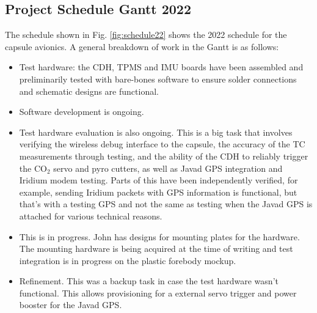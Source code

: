 \documentclass{article}
\begin{document}
\begin{landscape}
\begin{table}[!bp]
\begin{table}[H]
\begin{tabular}{p{3cm} | p{13cm}  L p{5cm}}
					
					
					
					
				\end{tabular}
			\end{table}
\end{table}
\end{landscape}
\restoregeometry


\begin{landscape}
\section{Project Schedule Gantt 2022}
The schedule shown in Fig. \ref{fig:schedule22} shows the 2022 schedule for the capsule avionics. A general breakdown of work in the Gantt is as follows:

\begin{itemize}
	\item Test hardware: the CDH, TPMS and IMU boards have been assembled and preliminarily tested with bare-bones software to ensure solder connections and schematic designs are functional.
	\item Software development is ongoing.
	\item Test hardware evaluation is also ongoing. This is a big task that involves verifying the wireless debug interface to the capsule, the accuracy of the TC measurements through testing, and the ability of the CDH to reliably trigger the CO$_2$ servo and pyro cutters, as well as Javad GPS integration and Iridium modem testing. Parts of this have been independently verified, for example, sending Iridium packets with GPS information is functional, but that's with a testing GPS and not the same as testing when the Javad GPS is attached for various technical reasons.
	\item This is in progress. John has designs for mounting plates for the hardware. The mounting hardware is being acquired at the time of writing and test integration is in progress on the plastic forebody mockup.
	\item Refinement. This was a backup task in case the test hardware wasn't functional. This allows provisioning for a external servo trigger and power booster for the Javad GPS.
\end{itemize}


\end{landscape}
\end{document}
